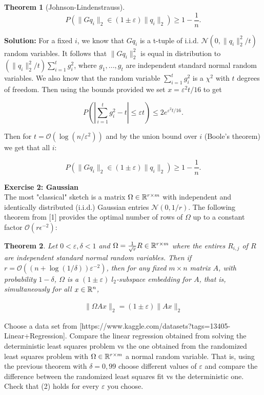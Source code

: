 \documentclass[11pt]{article}
\newcommand\bigO[1]{{\ensuremath{\mathcal{O}(#1)}}}
\newtheorem{theorem}{Theorem}
\begin{document}
\begin{enumerate}
\begin{theorem}[Johnson-Lindenstrauss]
\[ P\left( \|Gq_i\|_2 \in (1 \pm \varepsilon) \|q_i\|_2 \right) \geq 1 - \frac{1}{n}. \]
 
\end{theorem}

\textbf{Solution: } For a fixed $i$, we know that $Gq_i$ is a t-tuple of i.i.d. $\mathcal{N}(0, \|q_i\|_2^2/t)$ random variables. It follows that $\|Gq_i\|_2^2$ is equal in distribution to $(\|q_i\|_2^2/t) \sum_{i = 1}^t g_i^2$, where $g_1, ..., g_t$ are independent standard normal random variables. We also know that the random variable $\sum_{i = 1}^t g_i^2$ is a $\chi^2$ with $t$ degrees of freedom. Then using the bounds provided we set $x = \varepsilon^2 t/16$ to get 

\[ P\left( \left\lvert \sum_{i = 1}^t g_i^2 - t \right\rvert \leq \varepsilon t \right) \leq 2 e^{\varepsilon^2 t/16}. \]

Then for $t = \bigO{\log(n/\varepsilon^2)}$ and by the union bound over $i$ (Boole's theorem) we get that all $i$:

\[  P\left( \|Gq_i\|_2 \in (1 \pm \varepsilon) \|q_i\|_2 \right) \geq 1 - \frac{1}{n}. \]

\end{enumerate}



{\bf{Exercise 2: Gaussian}}\\

The most "classical" sketch is a matrix $\Omega \in \mathbb{R}^{r \times m}$ with independent and identically distributed (i.i.d.) Gaussian entries $\mathcal{N}(0, 1/r)$. The following theorem from [1] provides the optimal number of rows of $\Omega$ up to a constant factor $\bigO{r\epsilon^{-2}}$:

\begin{theorem}
Let $0 < \varepsilon, \delta < 1$ and $\Omega = \frac{1}{\sqrt{r}} R \in \mathbb{R}^{r \times m}$ where the entires $R_{i,j}$ of $R$ are independent standard normal random variables. Then if $r = \bigO{(n + \log(1/\delta))\varepsilon^{-2}}$, then for any fixed $m \times n$ matrix $A$, with probability $1-\delta$, $\Omega$ is a $(1 \pm \varepsilon) \; l_2$-subspace embedding for $A$, that is, simultaneously for all $x \in \mathbb{R}^{n}$,

\begin{align}
\|\Omega A x\|_2 = (1 \pm \varepsilon)\|Ax\|_2
\end{align}

\end{theorem}

Choose a data set from \href{https://www.kaggle.com/datasets?tags=13405-Linear+Regression}[https://www.kaggle.com/datasets?tags=13405-Linear+Regression]. Compare the linear regression obtained from solving the deterministic least squares problem vs the one obtained from the randomized least squares problem with $\Omega \in \mathbb{R}^{r \times m}$ a normal random variable. That is, using the previous theorem with $\delta = 0,99$ choose different values of $\varepsilon$ and compare the difference between the randomized least squares fit vs the deterministic one. Check that (2) holds for every $\varepsilon$ you choose.
\end{document}
